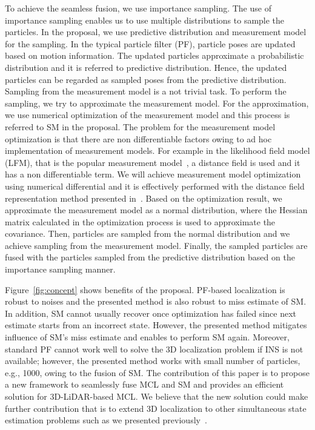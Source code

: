 \documentclass[letterpaper, 10 pt, conference]{ieeeconf}  %
\begin{document}
To achieve the seamless fusion, we use importance sampling.
The use of importance sampling enables us to use multiple distributions to sample the particles.
In the proposal, we use predictive distribution and measurement model for the sampling.
In the typical particle filter (PF), particle poses are updated based on motion information.
The updated particles approximate a probabilistic distribution and it is referred to predictive distribution.
Hence, the updated particles can be regarded as sampled poses from the predictive distribution.
Sampling from the measurement model is a not trivial task.
To perform the sampling, we try to approximate the measurement model.
For the approximation, we use numerical optimization of the measurement model and this process is referred to SM in the proposal.
The problem for the measurement model optimization is that there are non differentiable factors owing to ad hoc implementation of measurement models.
For example in the likelihood field model (LFM), that is the popular measurement model~\cite{Thrun:2005:PR:1121596}, a distance field is used and it has a non differentiable term.
We will achieve measurement model optimization using numerical differential and it is effectively performed with the distance field representation method presented in~\cite{AkaiIV2020}.
Based on the optimization result, we approximate the measurement model as a normal distribution, where the Hessian matrix calculated in the optimization process is used to approximate the covariance.
Then, particles are sampled from the normal distribution and we achieve sampling from the measurement model.
Finally, the sampled particles are fused with the particles sampled from the predictive distribution based on the importance sampling manner.

Figure~\ref{fig:concept} shows benefits of the proposal.
PF-based localization is robust to noises and the presented method is also robust to miss estimate of SM.
In addition, SM cannot usually recover once optimization has failed since next estimate starts from an incorrect state.
However, the presented method mitigates influence of SM's miss estimate and enables to perform SM again.
Moreover, standard PF cannot work well to solve the 3D localization problem if INS is not available; however, the presented method works with small number of particles, e.g., 1000, owing to the fusion of SM.
The contribution of this paper is to propose a new framework to seamlessly fuse MCL and SM and provides an efficient solution for 3D-LiDAR-based MCL.
We believe that the new solution could make further contribution that is to extend 3D localization to other simultaneous state estimation problems such as we presented previously~\cite{AkaiJFR2023}.
\end{document}
